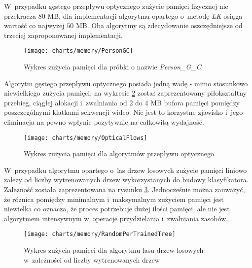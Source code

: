     W~przypadku gęstego przepływu optycznego zużycie pamięci fizycznej nie przekracza $80$ MB, dla implementacji algorytmu opartego o~metodę \textit{LK} osiąga wartość co najwyżej $50$ MB. Oba algorytmy są zdecydowanie oszczędniejsze od trzeciej zaproponowanej implementacji.

      \begin{figure}[!ht]
        \centering
        \texttt{[image: charts/memory/PersonGC]}
        \caption[Wykres zużycia pamięci dla próbki o nazwie Person\_G\_C]
                {Wykres zużycia pamięci dla próbki o nazwie \textit{Person\_G\_C}}
        \label{fig:MemoryUsagePersonGC}
      \end{figure}

    Algorytm gęstego przepływu optycznego posiada jedną wadę - mimo stosunkowo niewielkiego zużycia pamięci, na wykresie \ref{fig:OpticalFlowsMemoryUsage} został zaprezentowany piłokształtny przebieg, ciągłej alokacji i~zwalniania od 2 do 4 MB bufora pamięci pomiędzy poszczególnymi klatkami sekwencji wideo. Nie jest to korzystne zjawisko i~jego eliminacja na pewno wpłynie pozytywnie na całkowitą wydajność.

      \begin{figure}[!ht]
        \centering
        \texttt{[image: charts/memory/OpticalFlows]}
        \caption[Wykres zużycia pamięci dla algorytmów przepływu optycznego]
                {Wykres zużycia pamięci dla algorytmów przepływu optycznego}
        \label{fig:OpticalFlowsMemoryUsage}
      \end{figure}

    W~przypadku algorytmu opartego o~las drzew losowych zużycie pamięci liniowo zależy od liczby wytrenowanych drzew wykorzystanych do budowy klasyfikatora. Zależność została zaprezentowana na rysunku \ref{fig:RandomForestTrackerPerTrainedTreesAmount}. Jednocześnie można zauważyć, że różnica pomiędzy minimalnym i~maksymalnym zużyciem pamięci jest niewielka co oznacza, że proces potrzebuje dużej ilości pamięci, ale nie jest algorytmem intensywnym w~operacje przydzielania i~zwalniania zasobów.

      \begin{figure}[!ht]
        \centering
        \texttt{[image: charts/memory/RandomPerTrainedTree]}
        \caption[Wykres zużycia pamięci dla algorytmu lasu drzew losowych w~zależności od liczby wytrenowanych drzew]
                {Wykres zużycia pamięci dla algorytmu lasu drzew losowych w~zależności od liczby wytrenowanych drzew}
        \label{fig:RandomForestTrackerPerTrainedTreesAmount}
      \end{figure}

